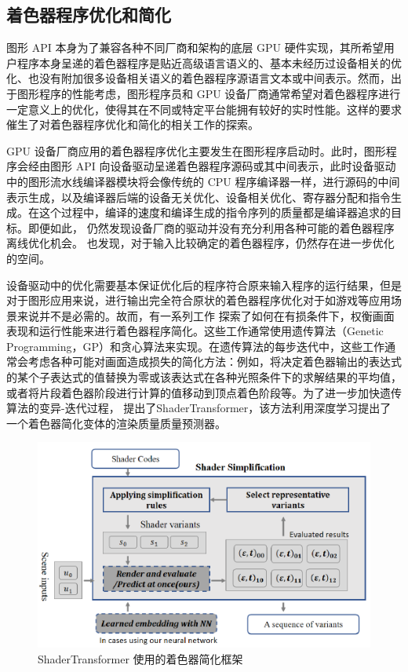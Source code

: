 \subsection{着色器程序优化和简化}

图形 API 本身为了兼容各种不同厂商和架构的底层 GPU 硬件实现，其所希望用户程序本身呈递的着色器程序是贴近高级语言语义的、基本未经历过设备相关的优化、也没有附加很多设备相关语义的着色器程序源语言文本或中间表示。然而，出于图形程序的性能考虑，图形程序员和 GPU 设备厂商通常希望对着色器程序进行一定意义上的优化，使得其在不同或特定平台能拥有较好的实时性能。这样的要求催生了对着色器程序优化和简化的相关工作的探索。

GPU 设备厂商应用的着色器程序优化主要发生在图形程序启动时。此时，图形程序会经由图形 API 向设备驱动呈递着色器程序源码或其中间表示，此时设备驱动中的图形流水线编译器模块将会像传统的 CPU 程序编译器一样，进行源码的中间表示生成，以及编译器后端的设备无关优化、设备相关优化、寄存器分配和指令生成。在这个过程中，编译的速度和编译生成的指令序列的质量都是编译器追求的目标。即便如此，\citet{8366956} 仍然发现设备厂商的驱动并没有充分利用各种可能的着色器程序离线优化机会。\citet{8891638} 也发现，对于输入比较确定的着色器程序，仍然存在进一步优化的空间。

设备驱动中的优化需要基本保证优化后的程序符合原来输入程序的运行结果，但是对于图形应用来说，进行输出完全符合原状的着色器程序优化对于如游戏等应用场景来说并不是必需的。故而，有一系列工作 \cite{10.1145/3528233.3530722, 10.1145/2661229.2661276, 10.1145/2070781.2024186, 10.1145/2816795.2818104, 9815871} 探索了如何在有损条件下，权衡画面表现和运行性能来进行着色器程序简化。这些工作通常使用遗传算法（Genetic Programming，GP）和贪心算法来实现。在遗传算法的每步迭代中，这些工作通常会考虑各种可能对画面造成损失的简化方法：例如，将决定着色器输出的表达式的某个子表达式的值替换为零或该表达式在各种光照条件下的求解结果的平均值，或者将片段着色器阶段进行计算的值移动到顶点着色阶段等。为了进一步加快遗传算法的变异-迭代过程，\citet{10.1145/3528233.3530722} 提出了ShaderTransformer，该方法利用深度学习提出了一个着色器简化变体的渲染质量质量预测器。

\begin{figure}
    \centering
    \includegraphics{figures/ShaderTransformer-Pipeline.pdf}
    \caption{ShaderTransformer 使用的着色器简化框架\cite{10.1145/3528233.3530722}}
    \label{fig:shdrTxfmr-framework}
\end{figure}


